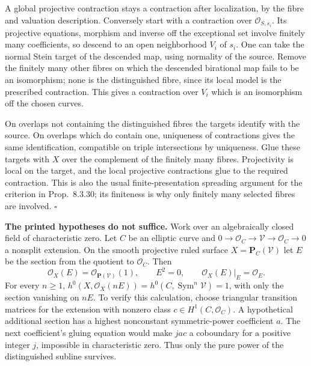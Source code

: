\documentclass[11pt]{article}
\let\chapterexercise\exercise
\renewcommand{\exercise}[2]{\Needspace{8\baselineskip}\chapterexercise{#1}{#2}}
\begin{document}
\pf
A global projective contraction stays a contraction after localization, by the fibre and valuation description. Conversely start with a contraction over $\mathcal O_{S,s_i}$. Its projective equations, morphism and inverse off the exceptional set involve finitely many coefficients, so descend to an open neighborhood $V_i$ of $s_i$. One can take the normal Stein target of the descended map, using normality of the source. Remove the finitely many other fibres on which the descended birational map fails to be an isomorphism; none is the distinguished fibre, since its local model is the prescribed contraction. This gives a contraction over $V_i$ which is an isomorphism off the chosen curves.

On overlaps not containing the distinguished fibres the targets identify with the source. On overlaps which do contain one, uniqueness of contractions gives the same identification, compatible on triple intersections by uniqueness. Glue these targets with $X$ over the complement of the finitely many fibres. Projectivity is local on the target, and the local projective contractions glue to the required contraction. This is also the usual finite-presentation spreading argument for the criterion in Prop.~8.3.30; its finiteness is why only finitely many selected fibres are involved. \hfill$\square$

\pf
\textbf{The printed hypotheses do not suffice.} Work over an algebraically closed field of characteristic zero. Let $C$ be an elliptic curve and $0\to\mathcal O_C\to\mathcal V\to\mathcal O_C\to0$ a nonsplit extension. On the smooth projective ruled surface $X=\mathbf P_C(\mathcal V)$ let $E$ be the section from the quotient to $\mathcal O_C$. Then
\[ \mathcal O_X(E)=\mathcal O_{\mathbf P(\mathcal V)}(1),\qquad
E^2=0,\qquad \mathcal O_X(E)|_E=\mathcal O_E. \]
For every $n\ge1$, $h^0(X,\mathcal O_X(nE))=h^0(C,\operatorname{Sym}^n\mathcal V)=1$, with only the section vanishing on $nE$. To verify this calculation, choose triangular transition matrices for the extension with nonzero class $c\in H^1(C,\mathcal O_C)$. A hypothetical additional section has a highest nonconstant symmetric-power coefficient $a$. The next coefficient's gluing equation would make $j a c$ a coboundary for a positive integer $j$, impossible in characteristic zero. Thus only the pure power of the distinguished subline survives.
\end{document}
